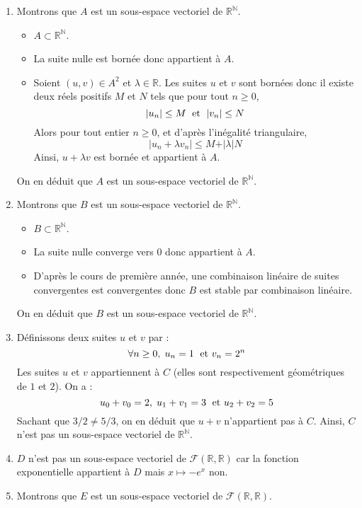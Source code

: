 \documentclass[a4paper,10pt]{report}
\begin{document}
\corr 

\begin{enumerate}
\item Montrons que $A$ est un sous-espace vectoriel de $\mathbb{R}^{\mathbb{N}}$.
\begin{itemize}
\item $A \subset \mathbb{R}^{\mathbb{N}}$.
\item La suite nulle est bornée donc appartient à $A$.
\item Soient $(u,v) \in A^2$ et $\lambda \in \mathbb{R}$. Les suites $u$ et $v$ sont bornées donc il existe deux réels positifs $M$ et $N$ tels que pour tout $n \geq 0$,
$$ \vert u_n \vert \leq M \; \hbox{ et } \; \vert v_n \vert \leq N$$
Alors pour tout entier $n \geq 0$, et d'après l'inégalité triangulaire,
$$ \vert u_n + \lambda v_n \vert \leq M+ \vert \lambda \vert N$$
Ainsi, $u+ \lambda v$ est bornée et appartient à $A$.
\end{itemize}
On en déduit que $A$ est un sous-espace vectoriel de $\mathbb{R}^{\mathbb{N}}$.
\item Montrons que $B$ est un sous-espace vectoriel de $\mathbb{R}^{\mathbb{N}}$.
\begin{itemize}
\item $B \subset \mathbb{R}^{\mathbb{N}}$.
\item La suite nulle converge vers $0$ donc appartient à $A$.
\item D'après le cours de première année, une combinaison linéaire de suites convergentes est convergentes donc $B$ est stable par combinaison linéaire.
\end{itemize}
On en déduit que $B$ est un sous-espace vectoriel de $\mathbb{R}^{\mathbb{N}}$.
\item Définissons deux suites $u$ et $v$ par :
$$ \forall n \geq 0, \; u_n = 1 \; \hbox{ et } v_n = 2^n$$
Les suites $u$ et $v$ appartiennent à $C$ (elles sont respectivement géométriques de $1$ et $2$). On a :
$$ u_0+v_0 = 2, \; u_1+v_1 = 3 \; \hbox{ et } u_2+v_2 = 5$$
Sachant que $3/2 \neq 5/3$, on en déduit que $u+v$ n'appartient pas à $C$. Ainsi, $C$ n'est pas un sous-espace vectoriel de $\mathbb{R}^{\mathbb{N}}$.
\item $D$ n'est pas un sous-espace vectoriel de $\mathcal{F}(\mathbb{R}, \mathbb{R})$ car la fonction exponentielle appartient à $D$ mais $x \mapsto -e^x$ non.
\item Montrons que $E$ est un sous-espace vectoriel de $\mathcal{F}(\mathbb{R}, \mathbb{R})$.
\begin{itemize}

\end{itemize}
\end{enumerate}
\end{document}
